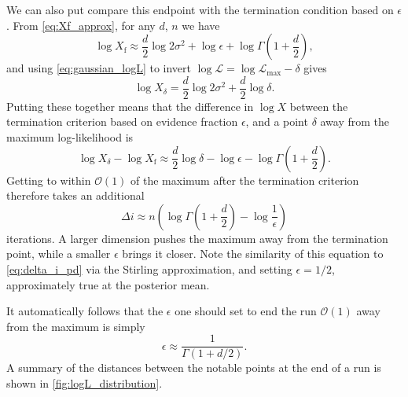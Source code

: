 \documentclass[usenatbib]{mnras}
\newcommand{\Like}{\mathcal{L}}
\newcommand{\logLmax}{\log \Like_\mathrm{max}}
\begin{document}
\par
We can also put compare this endpoint with the termination condition based on $\epsilon$. From \cref{eq:Xf_approx}, for any $d$, $n$ we have
\begin{equation}
    \log X_\mathrm{f} \approx \frac{d}{2}\log 2\sigma^2 + \log\epsilon + \log\Gamma\left(1+\frac{d}{2}\right),
\end{equation}
and using \cref{eq:gaussian_logL} to invert $\log\Like = \logLmax-\delta$ gives
\begin{equation}
    \log X_\delta=\frac{d}{2}\log 2\sigma^2+\frac{d}{2}\log\delta.
\end{equation}
Putting these together means that the difference in $\log X$ between the termination criterion based on evidence fraction $\epsilon$, and a point $\delta$ away from the maximum log-likelihood is
\begin{equation}
    \log X_\delta - \log X_\mathrm{f} \approx \frac{d}{2}\log\delta - \log\epsilon - \log\Gamma\left(1+\frac{d}{2}\right).
\end{equation}
Getting to within $\mathcal{O}(1)$ of the maximum after the termination criterion therefore takes an additional
 \begin{equation}
     \Delta i \approx n \left(\log\Gamma\left(1+\frac{d}{2}\right) - \log\frac{1}{\epsilon}\right)
\end{equation}
iterations. A larger dimension pushes the maximum away from the termination point, while a smaller $\epsilon$ brings it closer. Note the similarity of this equation to \cref{eq:delta_i_pd} via the Stirling approximation, and setting $\epsilon = 1/2$, approximately true at the posterior mean. 
\par
It automatically follows that the $\epsilon$ one should set to end the run $\mathcal{O}(1)$ away from the maximum is simply
\begin{equation}
    \boxed{\epsilon \approx \frac{1}{\Gamma\left(1 + d/2\right)}}.
\end{equation}
A summary of the distances between the notable points at the end of a run is shown in \cref{fig:logL_distribution}.
\end{document}
